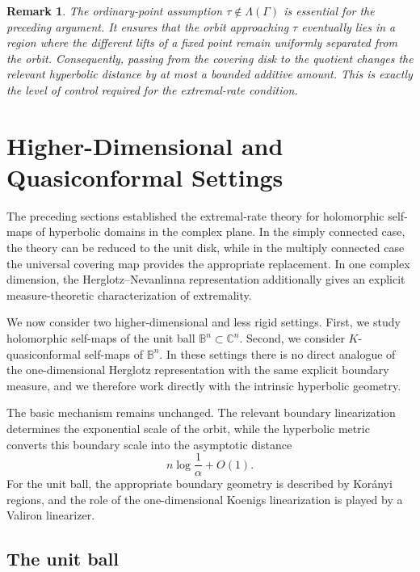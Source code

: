 \documentclass[10pt,a4paper]{amsart}
\numberwithin{equation}{section}
\newtheorem{remark}[equation]{Remark}
\begin{document}
\begin{remark}
The ordinary-point assumption
$\tau\notin\Lambda(\Gamma)$ is essential for the preceding argument. It
ensures that the orbit approaching $\tau$ eventually lies in a region
where the different lifts of a fixed point remain uniformly separated
from the orbit. Consequently, passing from the covering disk to the
quotient changes the relevant hyperbolic distance by at most a bounded
additive amount. This is exactly the level of control required for the
extremal-rate condition.
\end{remark}


\section{Higher-Dimensional and Quasiconformal Settings}
\label{sec:higher}

The preceding sections established the extremal-rate theory for
holomorphic self-maps of hyperbolic domains in the complex plane. In the
simply connected case, the theory can be reduced to the unit disk, while
in the multiply connected case the universal covering map provides the
appropriate replacement. In one complex dimension, the Herglotz--Nevanlinna
representation additionally gives an explicit measure-theoretic
characterization of extremality.

We now consider two higher-dimensional and less rigid settings. First, we
study holomorphic self-maps of the unit ball
$\mathbb B^n\subset\mathbb C^n$. Second, we consider
$K$-quasiconformal self-maps of $\mathbb B^n$. In these settings there is
no direct analogue of the one-dimensional Herglotz representation with
the same explicit boundary measure, and we therefore work directly with
the intrinsic hyperbolic geometry.

The basic mechanism remains unchanged. The relevant boundary
linearization determines the exponential scale of the orbit, while the
hyperbolic metric converts this boundary scale into the asymptotic
distance
\begin{equation*}
n\log\frac1\alpha+O(1).
\end{equation*}
For the unit ball, the appropriate boundary geometry is described by
Kor\'anyi regions, and the role of the one-dimensional Koenigs
linearization is played by a Valiron linearizer.

\subsection{The unit ball}
\label{subsec:ball}
\end{document}

